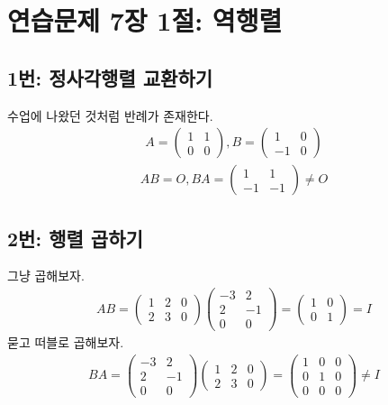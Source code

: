 \section{연습문제 7장 1절: 역행렬}
\subsection{1번: 정사각행렬 교환하기}
수업에 나왔던 것처럼 반례가 존재한다.
\begin{align*}
A=\begin{pmatrix}
1 & 1\\
0 & 0
\end{pmatrix},
B=\begin{pmatrix}
1 & 0\\
-1 & 0
\end{pmatrix}
\end{align*}
\begin{align*}
AB=O, BA=\begin{pmatrix}1 & 1\\-1 & -1\end{pmatrix}\neq O
\end{align*}

\subsection{2번: 행렬 곱하기}
그냥 곱해보자.
\begin{align*}
AB=\begin{pmatrix}1 & 2 & 0\\2 & 3 & 0\end{pmatrix}\begin{pmatrix}-3 & 2\\2 & -1\\0 & 0\end{pmatrix}=\begin{pmatrix}1 & 0\\0 & 1\end{pmatrix}=I
\end{align*}
묻고 떠블로 곱해보자.
\begin{align*}
BA=\begin{pmatrix}-3 & 2\\2 & -1\\0 & 0\end{pmatrix}\begin{pmatrix}1 & 2 & 0\\2 & 3 & 0\end{pmatrix}=\begin{pmatrix}1 & 0 & 0\\0 & 1 & 0\\0 & 0 & 0\end{pmatrix}\neq I
\end{align*}

